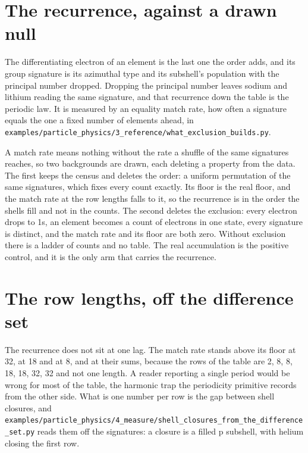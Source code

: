 \section{The recurrence, against a drawn null}

The differentiating electron of an element is the last one the order adds, and its group signature is
its azimuthal type and its subshell's population with the principal number dropped. Dropping the
principal number leaves sodium and lithium reading the same signature, and that recurrence down the
table is the periodic law. It is measured by an equality match rate, how often a signature equals the
one a fixed number of elements ahead, in
\texttt{examples/\allowbreak{}particle\_physics/\allowbreak{}3\_reference/\allowbreak{}what\_exclusion\_builds.py}.

A match rate means nothing without the rate a shuffle of the same signatures reaches, so two
backgrounds are drawn, each deleting a property from the data. The first keeps the census and deletes
the order: a uniform permutation of the same signatures, which fixes every count exactly. Its floor
is the real floor, and the match rate at the row lengths falls to it, so the recurrence is in the
order the shells fill and not in the counts. The second deletes the exclusion: every electron drops
to 1s, an element becomes a count of electrons in one state, every signature is distinct, and the
match rate and its floor are both zero. Without exclusion there is a ladder of counts and no table.
The real accumulation is the positive control, and it is the only arm that carries the recurrence.

\section{The row lengths, off the difference set}

The recurrence does not sit at one lag. The match rate stands above its floor at 32, at 18 and at 8,
and at their sums, because the rows of the table are 2, 8, 8, 18, 18, 32, 32 and not one length. A
reader reporting a single period would be wrong for most of the table, the harmonic trap the
periodicity primitive records from the other side. What is one number per row is the gap between
shell closures, and
\texttt{examples/\allowbreak{}particle\_physics/\allowbreak{}4\_measure/\allowbreak{}shell\_closures\_from\_the\_difference\_set.py}
reads them off the signatures: a closure is a filled p subshell, with helium closing the first row.

